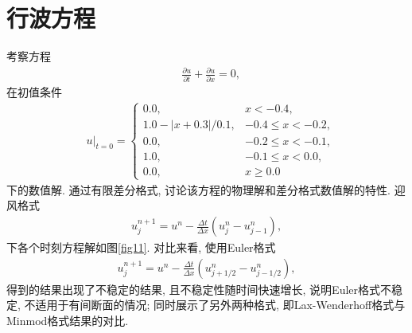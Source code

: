\documentclass[10.5pt
]{article}
\begin{document}
\section{行波方程}
考察方程
\begin{align}
& \frac{\partial u}{\partial t} + \frac{\partial u}{\partial x} = 0,
\label{EqnCon}
\end{align}
在初值条件
\begin{align}
& u|_{t=0} = \left\{\begin{array}{ll} 0.0, & x < -0.4, \\
1.0 - |x + 0.3| / 0.1, & -0.4 \le x < -0.2, \\
0.0, & -0.2 \le x < -0.1, \\
1.0 , & -0.1 \le x < 0.0, \\
0.0, & x \ge 0.0
\end{array}\right.
\end{align}
下的数值解. 通过有限差分格式, 讨论该方程的物理解和差分格式数值解的特性.
迎风格式
\begin{align}
u_j^{n+1} = u^n - \frac{\Delta t}{\Delta x} (u_j^n - u_{j-1}^n), \label{EqnUpwind}
\end{align}
下各个时刻方程解如图\ref{fig11}. 对比来看, 使用Euler格式
\begin{align}
u_j^{n+1} = u^n - \frac{\Delta t}{\Delta x} (u_{j+1/2}^n- u_{j-1/2}^n), \label{EqnEuler}
\end{align}
得到的结果出现了不稳定的结果, 且不稳定性随时间快速增长, 说明Euler格式不稳定, 不适用于有间断面的情况; 同时展示了另外两种格式, 即Lax-Wenderhoff格式与Minmod格式结果的对比. 
\end{document}
